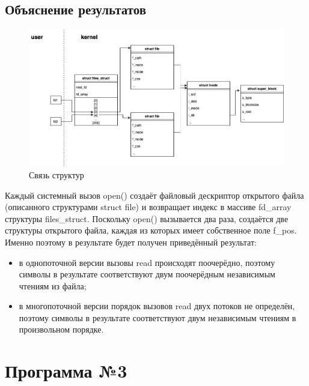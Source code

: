 \documentclass[12pt]{report}
\begin{document}
\subsection*{Объяснение результатов}
\begin{figure}[H]
	\centering
	\includegraphics[scale=0.45]{os_lab_05-2.jpg}
	\caption{Связь структур}
	\label{fig:1}
\end{figure}
Каждый системный вызов open() создаёт файловый дескриптор открытого файла (описанного структурами struct file) и возвращает индекс в массиве fd\_array структуры files\_struct. Поскольку open() вызывается два раза, создаётся две структуры открытого файла, каждая из которых имеет собственное поле f\_pos. Именно поэтому в результате будет получен приведённый результат:
\begin{itemize}
    \item в однопоточной версии вызовы read происходят поочерёдно, поэтому символы в результате соответствуют двум поочерёдным независимым чтениям из файла;
    \item в многопоточной версии порядок вызовов read двух потоков не определён, поэтому символы в результате соответствуют двум независимым чтениям в произвольном порядке.
\end{itemize}
\section*{Программа №3}
\end{document}
